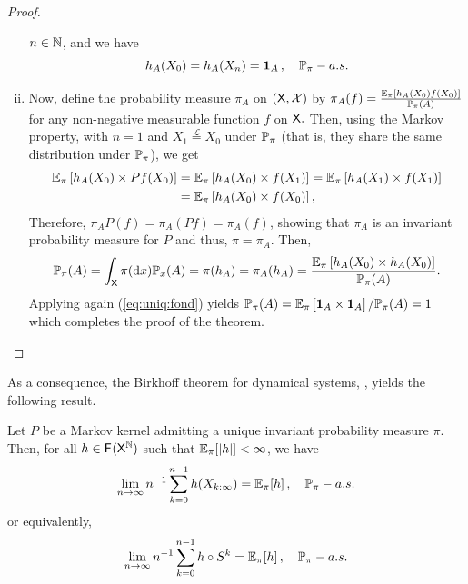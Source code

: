 \documentclass[english,graybox,envcountchap,envcountsame,sectrefs,shortlabels]{svmono}
\theoremstyle{style}
\newcommand{\fracc}[2]{\frac{#1}{#2}}
\begin{document}
\begin{proof}
\begin{enumerate}[(i)]
$n\in\mathbb{N}$, and we have
\begin{equation}
h_{A}(X_{0})=h_{A}(X_{n})=\mathbf{1}_{A}\,,\quad\mathbb{P}_{\pi}-a.s.\label{eq:uniq:fond}
\end{equation}
\item Now, define the probability measure $\pi_{A}$ on $(\mathsf{X},\mathcal{X})$
by $\pi_{A}(f)=\fracc{\PE_{\pi}\left[h_A(X_0)f(X_{0})\right]}{\PP_{\pi}(A)}$
for any non-negative measurable function $f$ on $\mathsf{X}.$ Then, using the Markov property,  with $n=1$ and $X_{1}\stackrel{\mathcal{L}}{=}X_{0}$
under $\mathbb{P}_{\pi}$ (that is, they share the same distribution under
$\mathbb{P}_{\pi}$), we get
\begin{align*}
\mathbb{E}_{\pi}\left[h_{A}(X_{0})\times Pf(X_{0})\right]&=\mathbb{E}_{\pi}\left[h_{A}(X_{0})\times f(X_{1})\right]=\mathbb{E}_{\pi}\left[h_{A}(X_{1})\times f(X_{1})\right]\\
 & =\mathbb{E}_{\pi}\left[h_{A}(X_{0})\times f(X_{0})\right],
\end{align*}
 Therefore, $\pi_{A}P(f)=\pi_{A}(Pf)=\pi_{A}(f)$, showing that $\pi_{A}$
is an invariant probability measure for $P$ and thus, $\pi=\pi_{A}$.
Then,
\[
\PP_{\pi}(A)=\int_{\Xset}\pi(\rmd x)\PP_{x}(A)=\pi(h_{A})=\pi_{A}(h_{A})=\fracc{\PE_{\pi}\left[h_A(X_0)\times h_{A}(X_{0})\right]}{\PP_{\pi}(A)}.
\]
Applying again (\ref{eq:uniq:fond}) yields $\mathbb{P}_{\pi}(A)=\mathbb{E}_{\pi}\left[\mathbf{1}_{A}\times\mathbf{1}_{A}\right]/\mathbb{P}_{\pi}(A)=1$
which completes the proof of the theorem.
\end{enumerate}
\end{proof}

As a consequence, the Birkhoff theorem for dynamical systems, ,
yields the following result.
\begin{theorem}
\label{thm:birk:mrkv:genr}Let $P$ be a Markov kernel admitting a
unique invariant probability measure $\pi.$ Then, for all $h\in\mathsf{F_{}}(\mathsf{X}^{\mathbb{N}})$
such that $\mathbb{E}_{\pi}[|h|]<\infty$, we have
\[
\lim_{n\to\infty}n^{-1}\sum_{k=0}^{n-1}h(X_{k:\infty})=\mathbb{E}_{\pi}[h]\,,\quad\mathbb{P}_{\pi}-a.s.
\]
or equivalently,
\[
\lim_{n\to\infty}n^{-1}\sum_{k=0}^{n-1}h\circ S^{k}=\mathbb{E}_{\pi}[h]\,,\quad\mathbb{P}_{\pi}-a.s.
\]
\end{theorem}
\end{document}
